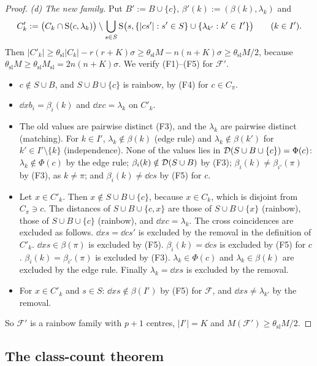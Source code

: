 \begin{proof}
\emph{(d) The new family.} Put $B':=B\cup\{c\}$, $\beta'(k):=(\beta(k),\lambda_k)$ and
\[
C'_k:=\bigl(C_k\cap\mathrm{S}(c,\lambda_k)\bigr)\setminus\bigcup_{s\in S}\mathrm{S}\bigl(s,\{|cs'|:s'\in S\}\cup\{\lambda_{k'}:k'\in I'\}\bigr)\qquad(k\in I').
\]
Then $|C'_k|\ge\theta_{\mathrm{sl}}|C_k|-r(r+K)\sigma\ge\theta_{\mathrm{sl}}M-n(n+K)\sigma\ge\theta_{\mathrm{sl}}M/2$, because
$\theta_{\mathrm{sl}}M\ge\theta_{\mathrm{sl}}M_{\mathrm{sl}}=2n(n+K)\sigma$. We verify (F1)--(F5) for $\mathcal F'$.
\begin{itemize}[leftmargin=1.5em]
\item[(F1)] $c\notin S\cup B$, and $S\cup B\cup\{c\}$ is rainbow, by (F4) for $c\in C_\pi$.
\item[(F2)] $\dd x{b_i}=\beta_i(k)$ and $\dd xc=\lambda_k$ on $C'_k$.
\item[(F3)] The old values are pairwise distinct (F3), and the $\lambda_k$ are pairwise distinct (matching). For $k\in I'$,
  $\lambda_k\notin\beta(k)$ (edge rule) and $\lambda_k\notin\beta(k')$ for $k'\in I'\setminus\{k\}$ (independence). None of the
  values lies in $\mathcal{D}(S\cup B\cup\{c\})=\Phi(c)$: $\lambda_k\notin\Phi(c)$ by the edge rule; $\beta_i(k)\notin\mathcal{D}(S\cup B)$ by
  (F3); $\beta_i(k)\ne\beta_{i'}(\pi)$ by (F3), as $k\ne\pi$; and $\beta_i(k)\ne\dd cs$ by (F5) for $c$.
\item[(F4)] Let $x\in C'_k$. Then $x\notin S\cup B\cup\{c\}$, because $x\in C_k$, which is disjoint from $C_\pi\ni c$. The distances of
  $S\cup B\cup\{c,x\}$ are those of $S\cup B\cup\{x\}$ (rainbow), those of $S\cup B\cup\{c\}$ (rainbow), and $\dd xc=\lambda_k$.
  The cross coincidences are excluded as follows. $\dd xs=\dd c{s'}$ is excluded by the removal in the definition of
  $C'_k$. $\dd xs\in\beta(\pi)$ is excluded by (F5). $\beta_i(k)=\dd cs$ is excluded by (F5) for $c$. $\beta_i(k)=\beta_{i'}(\pi)$
  is excluded by (F3). $\lambda_k\in\Phi(c)$ and $\lambda_k\in\beta(k)$ are excluded by the edge rule. Finally $\lambda_k=\dd xs$
  is excluded by the removal.
\item[(F5)] For $x\in C'_k$ and $s\in S$: $\dd xs\notin\beta(I')$ by (F5) for $\mathcal F$, and $\dd xs\ne\lambda_{k'}$ by the
  removal.
\end{itemize}
So $\mathcal F'$ is a rainbow family with $p+1$ centres, $|I'|=K$ and $M(\mathcal F')\ge\theta_{\mathrm{sl}}M/2$.
\end{proof}

\subsection{The class-count theorem}

